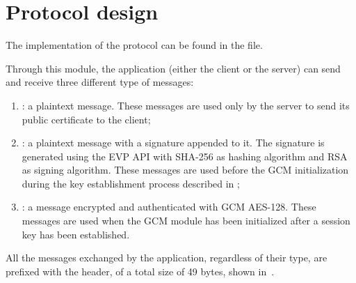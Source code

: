 \chapter{Protocol design}\label{ch:proto}

The implementation of the protocol can be found in the 
file.

Through this module, the application (either the client or the server) can send
and receive three different type of messages:
\begin{enumerate}
	\item {}: a plaintext message. These messages are
		used only by the server to send its public certificate to the
		client;
	\item {}: a plaintext message with a signature
		appended to it. The signature is generated using the \openssl{}
		EVP API with SHA-256 as hashing algorithm and RSA as signing
		algorithm. These messages are used before the GCM initialization
		during the key establishment process described in
		;
	\item {}: a message encrypted and
		authenticated with GCM AES-128. These messages are used when the
		GCM module has been initialized after a session key has been
		established.
\end{enumerate}

All the messages exchanged by the application, regardless of their type, are
prefixed with the header, of a total size of 49 bytes, shown
in~.



